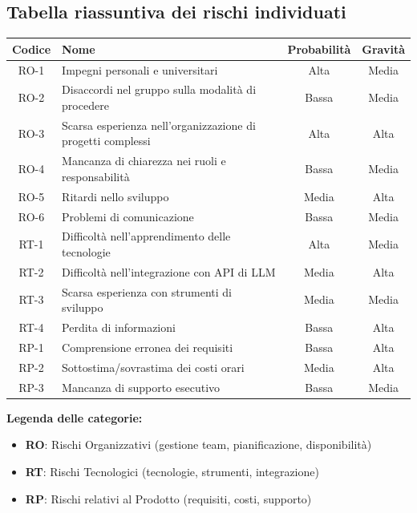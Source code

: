\documentclass[11pt,a4paper]{article}
\begin{document}
\subsection{Tabella riassuntiva dei rischi individuati}
\begin{center}
    \begin{tabular}{|c|l|c|c|}
        \hline
        \textbf{Codice} & \textbf{Nome} & \textbf{Probabilità} & \textbf{Gravità} \\
        \hline
        RO-1 & Impegni personali e universitari & Alta & Media \\
        \hline
        RO-2 & Disaccordi nel gruppo sulla modalità di procedere & Bassa & Media \\
        \hline
        RO-3 & Scarsa esperienza nell'organizzazione di progetti complessi & Alta & Alta \\
        \hline
        RO-4 & Mancanza di chiarezza nei ruoli e responsabilità & Bassa & Media \\
        \hline
        RO-5 & Ritardi nello sviluppo & Media & Alta \\
        \hline
        RO-6 & Problemi di comunicazione & Bassa & Media \\
        \hline
        RT-1 & Difficoltà nell'apprendimento delle tecnologie & Alta & Media \\
        \hline
        RT-2 & Difficoltà nell'integrazione con API di LLM & Media & Alta \\
        \hline
        RT-3 & Scarsa esperienza con strumenti di sviluppo & Media & Media \\
        \hline
        RT-4 & Perdita di informazioni & Bassa & Alta \\
        \hline
        RP-1 & Comprensione erronea dei requisiti & Bassa & Alta \\
        \hline
        RP-2 & Sottostima/sovrastima dei costi orari & Media & Alta \\
        \hline
        RP-3 & Mancanza di supporto esecutivo & Bassa & Media \\
        \hline
    \end{tabular}
\end{center}

\textbf{Legenda delle categorie:}
\begin{itemize}
    \item \textbf{RO}: Rischi Organizzativi (gestione team, pianificazione, disponibilità)
    \item \textbf{RT}: Rischi Tecnologici (tecnologie, strumenti, integrazione)
    \item \textbf{RP}: Rischi relativi al Prodotto (requisiti, costi, supporto)
\end{itemize}
\end{document}

